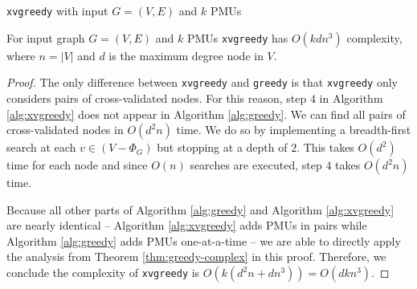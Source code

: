 \begin{algorithm}
\caption{{\tt xvgreedy} with input $G=(V,E)$ and $k$ PMUs}
\label{alg:xvgreedy}

\begin{algorithmic}[1]

		\ENDFOR
		\REPEAT
				\ENDIF
			\ENDFOR
		\ENDIF
	\ENDFOR
\ENDFOR
\end{algorithmic}
\end{algorithm}

\begin{theorem}
For input graph $G=(V,E)$ and $k$ PMUs {\tt xvgreedy} has $O(kdn^3)$ complexity, where $n=|V|$ and $d$ is the maximum degree node in $V$.
\label{thm:app-xvgreedy-complex}
\end{theorem}
\begin{proof}
	The only difference between {\tt xvgreedy} and {\tt greedy} is that {\tt xvgreedy} only considers pairs of cross-validated nodes. For this reason, 
	step $4$ in Algorithm \ref{alg:xvgreedy} does not appear in Algorithm \ref{alg:greedy}.  We can find all pairs of cross-validated nodes in $O(d^2n)$ time.  We do so by 
	implementing a breadth-first search at each $v \in (V - \Phi_G)$ but stopping at a depth of $2$.  This takes $O(d^2)$ time for each node and since 
	$O(n)$ searches are executed, step $4$ takes $O(d^2n)$ time.

	Because all other parts of Algorithm \ref{alg:greedy} and Algorithm \ref{alg:xvgreedy} are nearly identical -- Algorithm \ref{alg:xvgreedy}
	adds PMUs in pairs while Algorithm \ref{alg:greedy} adds PMUs one-at-a-time -- we are able to directly apply
	the analysis from Theorem \ref{thm:greedy-complex} in this proof.  Therefore, we conclude the complexity of {\tt xvgreedy} is $O(k(d^2n + dn^3)) = O(dkn^3)$. 
\end{proof}



